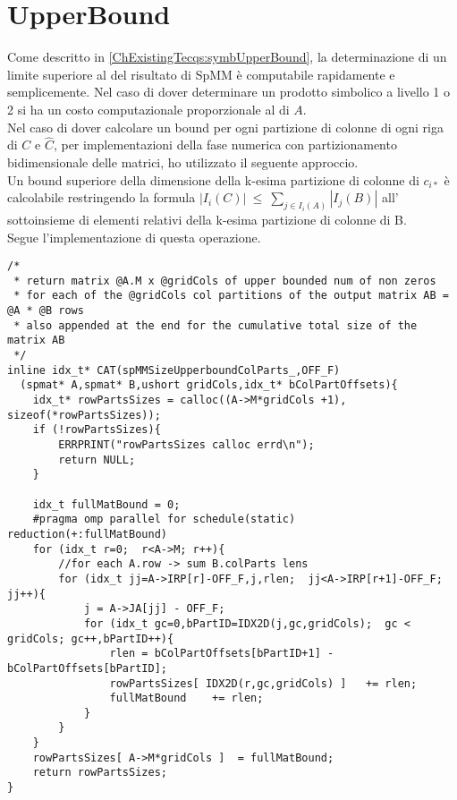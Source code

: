 \section{UpperBound} \label{chSpMMSymb:UpperBound}
Come descritto in \ref{ChExistingTecqs:symbUpperBound}, la determinazione di un limite superiore al \nnnz 
del risultato di SpMM è computabile rapidamente e semplicemente.
\voidLine
Nel caso di dover determinare un prodotto simbolico a livello 1 o 2 %
si ha un costo computazionale proporzionale al \nnnz di $A$.\\
\voidLine
Nel caso di dover calcolare un bound per ogni partizione di colonne di ogni riga di $C$ e $\hat{C}$,
per implementazioni della fase numerica con partizionamento bidimensionale delle matrici, ho utilizzato
il seguente approccio.\\
Un bound superiore della dimensione della k-esima partizione di colonne di $c_{i*}$ 
è calcolabile restringendo la formula $ | I_i(C) |~\leq~\sum\limits_{ j \in I_i(A) }  | I_j(B) | $
all' sottoinsieme di elementi \nnz relativi della k-esima partizione di colonne di B.\\
Segue l'implementazione di questa operazione.\\
\begin{lstlisting}
/* 
 * return matrix @A.M x @gridCols of upper bounded num of non zeros
 * for each of the @gridCols col partitions of the output matrix AB = @A * @B rows
 * also appended at the end for the cumulative total size of the matrix AB 
 */
inline idx_t* CAT(spMMSizeUpperboundColParts_,OFF_F)
  (spmat* A,spmat* B,ushort gridCols,idx_t* bColPartOffsets){
    idx_t* rowPartsSizes = calloc((A->M*gridCols +1),  sizeof(*rowPartsSizes));
    if (!rowPartsSizes){
        ERRPRINT("rowPartsSizes calloc errd\n");
        return NULL;
    }

    idx_t fullMatBound = 0;
    #pragma omp parallel for schedule(static) reduction(+:fullMatBound)
    for (idx_t r=0;  r<A->M; r++){
        //for each A.row -> sum B.colParts lens     
        for (idx_t jj=A->IRP[r]-OFF_F,j,rlen;  jj<A->IRP[r+1]-OFF_F; jj++){
            j = A->JA[jj] - OFF_F;
            for (idx_t gc=0,bPartID=IDX2D(j,gc,gridCols);  gc < gridCols; gc++,bPartID++){
                rlen = bColPartOffsets[bPartID+1] - bColPartOffsets[bPartID];
                rowPartsSizes[ IDX2D(r,gc,gridCols) ]   += rlen;
                fullMatBound    += rlen;
            }
        }
    }
    rowPartsSizes[ A->M*gridCols ]  = fullMatBound;
    return rowPartsSizes;
}
\end{lstlisting}
